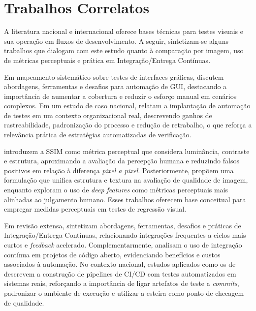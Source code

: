 \documentclass{UNESC}
\begin{document}
\section{Trabalhos Correlatos}

A literatura nacional e internacional oferece bases técnicas para testes visuais e sua operação em fluxos de desenvolvimento. A seguir, sintetizam-se alguns trabalhos que dialogam com este estudo quanto à comparação por imagem, uso de métricas perceptuais e prática em Integração/Entrega Contínuas.

Em mapeamento sistemático sobre testes de interfaces gráficas,  discutem abordagens, ferramentas e desafios para automação de GUI, destacando a importância de aumentar a cobertura e reduzir o esforço manual em cenários complexos. Em um estudo de caso nacional,  relatam a implantação de automação de testes em um contexto organizacional real, descrevendo ganhos de rastreabilidade, padronização do processo e redução de retrabalho, o que reforça a relevância prática de estratégias automatizadas de verificação.

 introduzem a SSIM como métrica perceptual que considera luminância, contraste e estrutura, aproximando a avaliação da percepção humana e reduzindo falsos positivos em relação à diferença \emph{pixel a pixel}. Posteriormente,  propõem uma formulação que unifica estrutura e textura na avaliação de qualidade de imagem, enquanto  exploram o uso de \emph{deep features} como métricas perceptuais mais alinhadas ao julgamento humano. Esses trabalhos oferecem base conceitual para empregar medidas perceptuais em testes de regressão visual.

Em revisão extensa,  sintetizam abordagens, ferramentas, desafios e práticas de Integração/Entrega Contínuas, relacionando integrações frequentes a ciclos mais curtos e \emph{feedback} acelerado. Complementarmente,  analisam o uso de integração contínua em projetos de código aberto, evidenciando benefícios e custos associados à automação. No contexto nacional, estudos aplicados como os de  descrevem a construção de pipelines de CI/CD com testes automatizados em sistemas reais, reforçando a importância de ligar artefatos de teste a \emph{commits}, padronizar o ambiente de execução e utilizar a esteira como ponto de checagem de qualidade.
\end{document}
